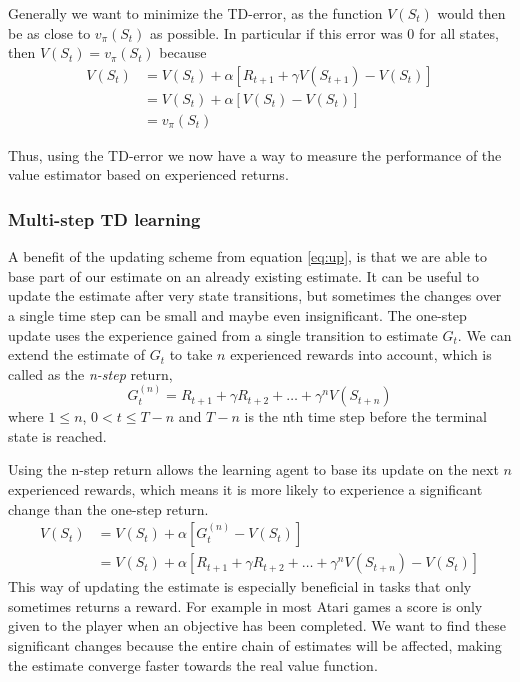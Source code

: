 \documentclass[11pt]{article}
\begin{document}
Generally we want to minimize the TD-error, as the function $V(S_t)$
would then be as close to $v_\pi(S_t)$ as possible.
In particular if this error was 0 for all states, then
$V(S_t) = v_\pi(S_t)$ because 
\begin{equation}
    \begin{aligned}
    V(S_t)  & = V(S_t) + \alpha  [R_{t+1} + \gamma  V(S_{t+1}) - V(S_t)]   \\
           & = V(S_t) + \alpha  [V(S_t) - V(S_t)]  \\
           & = v_\pi(S_t) 
    \end{aligned}
\end{equation}

Thus, using the TD-error we now have a way to measure the performance of
the value estimator based on experienced returns.

\subsubsection{Multi-step TD learning}\label{sec:multi}

A benefit of the updating scheme from equation \ref{eq:up}, is that we are able to base
part of our estimate on an already existing estimate.
It can be useful to update the estimate after very state transitions, but sometimes
the changes over a single time step can be small and maybe even insignificant.
The one-step update uses the experience gained from a single transition to
estimate $G_t$.
We can extend the estimate of $G_t$ to take $n$ experienced rewards
into account, which is called as the \textit{n-step} return,
\begin{equation}
    G^{(n)}_t = R_{t+1} + \gamma R_{t+2} + \dots + \gamma^n V(S_{t+n})
\end{equation}
where $1 \leq n$, $0 < t \leq T - n$ and $T - n$ is the nth time step before the terminal state
is reached.

Using the n-step return allows the learning agent to base its update on the next $n$ experienced
rewards, which means it is more likely to experience a significant change than the one-step return.
\begin{equation}
    \begin{aligned}    
        V(S_t) & = V(S_t) + \alpha [G^{(n)}_t - V(S_t)]\\
        & = V(S_t) + \alpha [R_{t+1} + \gamma R_{t+2} + \dots + \gamma^n V(S_{t+n}) - V(S_t)]
    \end{aligned}
\end{equation}
This way of updating the estimate is especially beneficial in tasks that only sometimes returns a reward. 
For example in most Atari games a score is only given to the player when an objective has been completed.
We want to find these significant changes because the entire chain of estimates 
will be affected, making the estimate converge faster towards the real value function.
\end{document}
